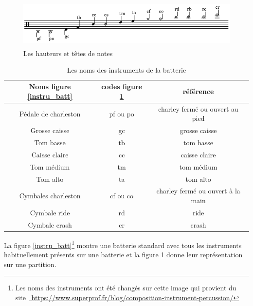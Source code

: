 \begin{figure}[!h]
\centering
\includegraphics[height=25mm, width=130mm]{
z_images/3_methodes/0_notation_de_la_batterie/2_hauteurs_et_tete_de_notes.png}
\caption{Les hauteurs et têtes de notes}
\label{haut}
\end{figure}

\begin{table}[h]
\centering
\begin{tabular}{|c|c|c|} \hline
Noms figure \ref{instru_batt} & codes figure \ref{haut}  & référence \\ \hline
Pédale de charleston & pf ou po & charley fermé ou ouvert au pied \\
Grosse caisse & gc & grosse caisse \\
Tom basse & tb & tom basse \\
Caisse claire & cc & caisse claire \\
Tom médium & tm & tom médium \\
Tom alto & ta & tom alto \\
Cymbales charleston & cf ou co & charley fermé ou ouvert à la main \\
Cymbale ride & rd & ride \\
Cymbale crash & cr & crash \\ \hline
	\end{tabular}
	\caption{Les noms des instruments de la batterie}
	\label{nom_instru_batt}
\end{table}\newpage
La figure \ref{instru_batt}\footnote{Les noms des instruments ont été changés
    sur cette image qui provient du site \url{
https://www.superprof.fr/blog/composition-instrument-percussion/}} montre une
batterie standard avec tous les instruments habituellement présents sur une
batterie et la figure \ref{haut} donne leur représentation sur une partition.\\


